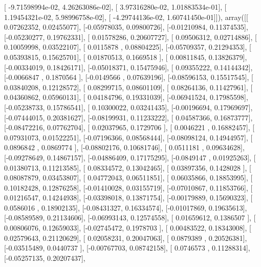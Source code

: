 \documentclass{article}
\begin{document}
       [ -9.71598994e-02,   4.26263086e-02],
       [  3.97316280e-02,   1.01883534e-01],
       [  1.19454321e-02,   5.98996758e-02],
       [ -4.29744136e-02,   1.60741450e-01]]), array([[ 0.07262352,  0.02455077],
       [-0.05978035,  0.09800726],
       [-0.01210984,  0.11374535],
       [-0.05230277,  0.19762331],
       [ 0.01578286,  0.20607727],
       [ 0.09506312,  0.02714886],
       [ 0.10059998,  0.03522107],
       [ 0.0115878 ,  0.08804225],
       [-0.05709357,  0.21294353],
       [ 0.05393815,  0.15625701],
       [ 0.01870513,  0.1669518 ],
       [ 0.00811845,  0.13826379],
       [-0.00334019,  0.18426171],
       [-0.05018371,  0.15475946],
       [ 0.09355222,  0.14144342],
       [-0.0066847 ,  0.1870564 ],
       [-0.0149566 ,  0.07639196],
       [-0.08596153,  0.15517545],
       [ 0.03840208,  0.12128572],
       [ 0.08299715,  0.08601109],
       [ 0.08264136,  0.11427961],
       [ 0.04360862,  0.05960131],
       [ 0.04184796,  0.19331039],
       [-0.06941524,  0.17985598],
       [-0.05238733,  0.15786541],
       [ 0.10300022,  0.03241435],
       [-0.00196694,  0.17969697],
       [-0.07444015,  0.20381627],
       [-0.08199931,  0.11233222],
       [ 0.04587366,  0.16873777],
       [-0.08472216,  0.07762704],
       [ 0.02037965,  0.1729706 ],
       [ 0.0046221 ,  0.16882457],
       [ 0.07931073,  0.01522251],
       [-0.07196366,  0.08568444],
       [-0.08098124,  0.14944957],
       [ 0.0896842 ,  0.0869774 ],
       [-0.08802176,  0.10681746],
       [ 0.0511181 ,  0.09634628],
       [-0.09278649,  0.14867157],
       [-0.04886409,  0.17175295],
       [-0.0849147 ,  0.01925263],
       [ 0.01380713,  0.11213585],
       [ 0.08334572,  0.13042465],
       [ 0.03897356,  0.1428028 ],
       [ 0.08087879,  0.03453807],
       [ 0.04772043,  0.06511851],
       [ 0.06035866,  0.18853995],
       [ 0.10182428,  0.12876258],
       [-0.01410028,  0.03155719],
       [-0.07010867,  0.11853766],
       [ 0.01216547,  0.14244938],
       [-0.03398018,  0.13871754],
       [-0.00179889,  0.15690323],
       [ 0.0586016 ,  0.18902135],
       [-0.08431327,  0.16334574],
       [-0.01017869,  0.19635613],
       [-0.08589589,  0.21134606],
       [-0.06993143,  0.12574558],
       [ 0.01659612,  0.1386507 ],
       [ 0.00806076,  0.12659033],
       [-0.02745472,  0.1978703 ],
       [ 0.00483522,  0.18343008],
       [ 0.02579643,  0.21120629],
       [ 0.02058231,  0.20047063],
       [ 0.0879389 ,  0.20526381],
       [-0.03515489,  0.0440737 ],
       [-0.00767703,  0.08742158],
       [ 0.0746573 ,  0.11288314],
       [-0.05257135,  0.20207437],
\end{document}
